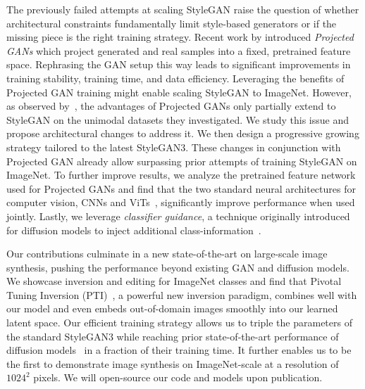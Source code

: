 The previously failed attempts at scaling StyleGAN raise the question of whether architectural constraints fundamentally limit style-based generators or if the missing piece is the right training strategy.
Recent work by \cite{Sauer2021NEURIPS} introduced \textit{Projected GANs} which project generated and real samples into a fixed, pretrained feature space. Rephrasing the GAN setup this way leads to significant improvements in training stability, training time, and data efficiency.
Leveraging the benefits of Projected GAN training might enable scaling StyleGAN to ImageNet.
However, as observed by~\cite{Sauer2021NEURIPS}, the advantages of Projected GANs only partially extend to StyleGAN on the unimodal datasets they investigated.
We study this issue and propose architectural changes to address it.
We then design a progressive growing strategy tailored to the latest StyleGAN3. 
These changes in conjunction with Projected GAN already allow surpassing prior attempts of training StyleGAN on ImageNet. 
To further improve results, we analyze the pretrained feature network used for Projected GANs and find that the two standard neural architectures for computer vision, CNNs and ViTs~\cite{Dosovitskiy2021ICLR}, significantly improve performance when used jointly. Lastly, we leverage \textit{classifier guidance}, a technique originally introduced for diffusion models to inject additional class-information~\cite{Dhariwal2021NEURIPS}.

Our contributions culminate in a new state-of-the-art on large-scale image synthesis, pushing the performance beyond existing GAN and diffusion models. 
We showcase inversion and editing for ImageNet classes and find that Pivotal Tuning Inversion (PTI)~\cite{Roich2021ARXIV}, a powerful new inversion paradigm, combines well with our model and even embeds out-of-domain images smoothly into our learned latent space. Our efficient training strategy allows us to triple the parameters of the standard StyleGAN3 while reaching prior state-of-the-art performance of diffusion models~\cite{Dhariwal2021NEURIPS} in a fraction of their training time. It further enables us to be the first to demonstrate image synthesis on ImageNet-scale at a resolution of $1024^2$ pixels. We will open-source our code and models upon publication. 
